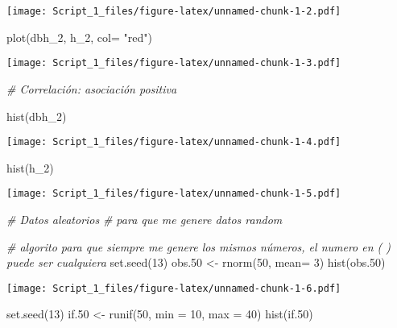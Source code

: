 \documentclass[
]{article}
\newenvironment{Shaded}{\begin{snugshade}}{\end{snugshade}}
\newcommand{\AttributeTok}[1]{\textcolor[rgb]{0.77,0.63,0.00}{#1}}
\newcommand{\CommentTok}[1]{\textcolor[rgb]{0.56,0.35,0.01}{\textit{#1}}}
\newcommand{\DecValTok}[1]{\textcolor[rgb]{0.00,0.00,0.81}{#1}}
\newcommand{\FloatTok}[1]{\textcolor[rgb]{0.00,0.00,0.81}{#1}}
\newcommand{\FunctionTok}[1]{\textcolor[rgb]{0.00,0.00,0.00}{#1}}
\newcommand{\NormalTok}[1]{#1}
\newcommand{\OtherTok}[1]{\textcolor[rgb]{0.56,0.35,0.01}{#1}}
\newcommand{\StringTok}[1]{\textcolor[rgb]{0.31,0.60,0.02}{#1}}
\begin{document}
\texttt{[image: Script\_1\_files/figure-latex/unnamed-chunk-1-2.pdf]}

\begin{Shaded}
\begin{Highlighting}[]
\FunctionTok{plot}\NormalTok{(dbh\_2, h\_2, }\AttributeTok{col=} \StringTok{"red"}\NormalTok{)}
\end{Highlighting}
\end{Shaded}

\texttt{[image: Script\_1\_files/figure-latex/unnamed-chunk-1-3.pdf]}

\begin{Shaded}
\begin{Highlighting}[]
\CommentTok{\# Correlación: asociación positiva}

\FunctionTok{hist}\NormalTok{(dbh\_2)}
\end{Highlighting}
\end{Shaded}

\texttt{[image: Script\_1\_files/figure-latex/unnamed-chunk-1-4.pdf]}

\begin{Shaded}
\begin{Highlighting}[]
\FunctionTok{hist}\NormalTok{(h\_2)}
\end{Highlighting}
\end{Shaded}

\texttt{[image: Script\_1\_files/figure-latex/unnamed-chunk-1-5.pdf]}

\begin{Shaded}
\begin{Highlighting}[]
\CommentTok{\# Datos aleatorios}
\CommentTok{\# para que me genere datos random}


\CommentTok{\# algorito para que siempre me genere los mismos números, el numero en (  ) puede ser cualquiera}
\FunctionTok{set.seed}\NormalTok{(}\DecValTok{13}\NormalTok{)}
\NormalTok{obs}\FloatTok{.50} \OtherTok{\textless{}{-}} \FunctionTok{rnorm}\NormalTok{(}\DecValTok{50}\NormalTok{, }\AttributeTok{mean=} \DecValTok{3}\NormalTok{)}
\FunctionTok{hist}\NormalTok{(obs}\FloatTok{.50}\NormalTok{)}
\end{Highlighting}
\end{Shaded}

\texttt{[image: Script\_1\_files/figure-latex/unnamed-chunk-1-6.pdf]}

\begin{Shaded}
\begin{Highlighting}[]
\FunctionTok{set.seed}\NormalTok{(}\DecValTok{13}\NormalTok{)}
\NormalTok{if}\FloatTok{.50} \OtherTok{\textless{}{-}} \FunctionTok{runif}\NormalTok{(}\DecValTok{50}\NormalTok{, }\AttributeTok{min =} \DecValTok{10}\NormalTok{, }\AttributeTok{max =} \DecValTok{40}\NormalTok{)}
\FunctionTok{hist}\NormalTok{(if}\FloatTok{.50}\NormalTok{)}
\end{Highlighting}
\end{Shaded}
\end{document}
